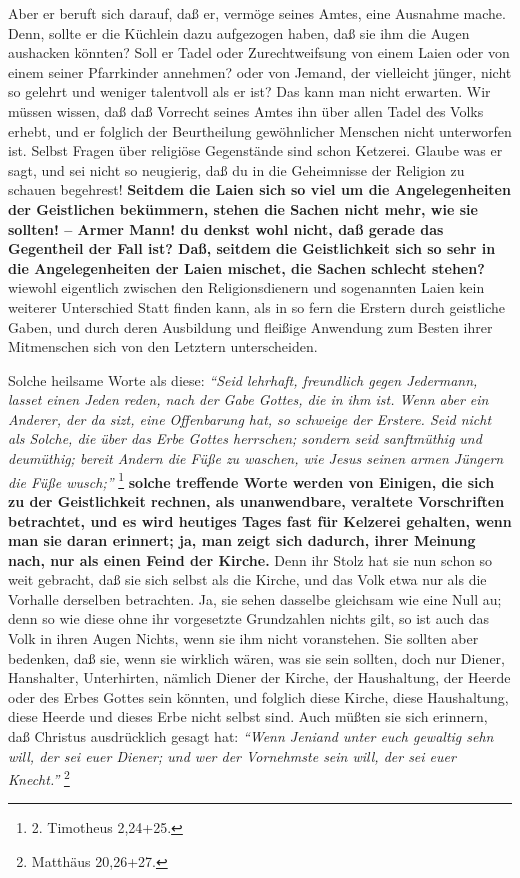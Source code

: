 Aber er beruft sich darauf, daß er, vermöge seines Amtes, eine
Ausnahme mache.
Denn, sollte er die Küchlein dazu aufgezogen haben, daß sie ihm die Augen
aushacken könnten? Soll er Tadel oder Zurechtweifsung von einem
Laien oder von
einem seiner Pfarrkinder annehmen? oder von Jemand, der vielleicht jünger, nicht
so gelehrt und weniger talentvoll als er ist? Das kann man nicht erwarten. Wir
müssen wissen, daß daß Vorrecht seines Amtes ihn über allen Tadel des Volks
erhebt, und er folglich der Beurtheilung gewöhnlicher Menschen nicht unterworfen
ist. Selbst Fragen über religiöse Gegenstände sind schon
Ketzerei. Glaube was er
sagt, und sei nicht so neugierig, daß du in die Geheimnisse der
Religion zu
schauen begehrest! \textbf{Seitdem die Laien sich so viel um die Angelegenheiten
der
Geistlichen bekümmern, stehen die Sachen nicht mehr, wie sie sollten! -- Armer
Mann! du denkst wohl nicht, daß gerade das Gegentheil der Fall ist? Daß, seitdem
die Geistlichkeit sich so sehr in die Angelegenheiten der Laien mischet, die
Sachen schlecht stehen?} wiewohl eigentlich zwischen den Religionsdienern und
sogenannten Laien kein weiterer Unterschied Statt finden kann, als in so fern
die Erstern durch geistliche Gaben, und durch deren Ausbildung und fleißige
Anwendung zum Besten ihrer Mitmenschen sich von den Letztern unterscheiden.

Solche heilsame Worte als diese:
\textit{"`Seid lehrhaft, freundlich gegen Jedermann,
lasset einen Jeden reden, nach der Gabe Gottes, die in ihm ist. Wenn aber ein
Anderer, der da sizt, eine Offenbarung hat, so schweige der Erstere. Seid nicht
als Solche, die über das Erbe Gottes herrschen; sondern seid sanftmüthig und
deumüthig; bereit Andern die Füße zu waschen, wie Jesus seinen armen Jüngern die
Füße wusch;"'}
\footnote{2. Timotheus 2,24+25.}
\textbf{solche treffende Worte werden von
Einigen, die sich zu der Geistlichkeit rechnen, als
unanwendbare, veraltete
Vorschriften betrachtet, und es wird heutiges Tages fast für
Kelzerei gehalten,
wenn man sie daran erinnert; ja, man zeigt sich dadurch, ihrer Meinung nach, nur
als einen Feind der Kirche.} Denn ihr Stolz hat sie nun
schon so weit gebracht,
daß sie sich selbst als die Kirche, und das Volk etwa nur als die Vorhalle
derselben betrachten. Ja, sie sehen dasselbe gleichsam wie eine Null au; denn so
wie diese ohne ihr vorgesetzte Grundzahlen nichts gilt, so ist auch das Volk in
ihren Augen Nichts, wenn sie ihm nicht voranstehen. Sie sollten aber bedenken,
daß sie, wenn sie wirklich wären, was sie sein sollten, doch nur Diener,
Hanshalter, Unterhirten, nämlich Diener der Kirche, der
Haushaltung, der Heerde
oder des Erbes Gottes sein könnten, und folglich diese Kirche, diese
Haushaltung, diese Heerde und dieses Erbe nicht selbst sind. Auch müßten sie
sich erinnern, daß Christus ausdrücklich gesagt hat:
\textit{"`Wenn Jeniand unter euch
gewaltig sehn will, der sei euer Diener; und wer der Vornehmste sein will, der
sei euer Knecht."'}
\footnote{Matthäus 20,26+27.}

